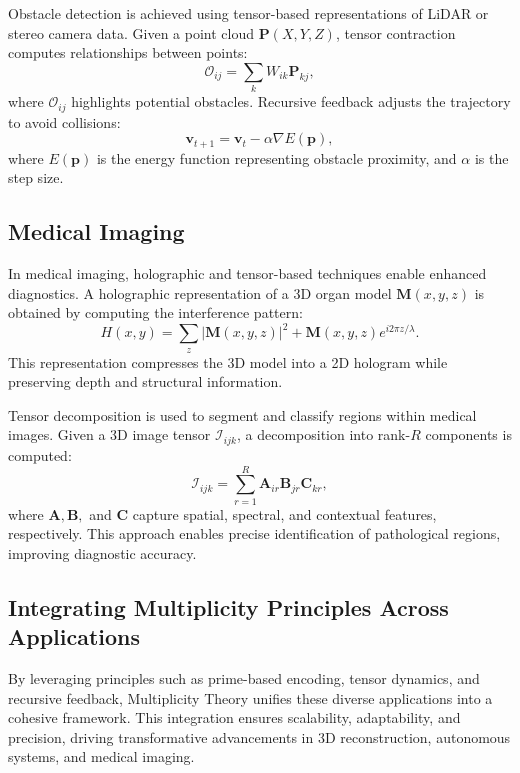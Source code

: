 \documentclass{article}
\theoremstyle{plain}
\begin{document}
Obstacle detection is achieved using tensor-based representations of LiDAR or stereo camera data. Given a point cloud \( \mathbf{P}(X, Y, Z) \), tensor contraction computes relationships between points:
\begin{equation}
\mathcal{O}_{ij} = \sum_{k} W_{ik} \mathbf{P}_{kj},
\end{equation}
where \( \mathcal{O}_{ij} \) highlights potential obstacles. Recursive feedback adjusts the trajectory to avoid collisions:
\begin{equation}
\mathbf{v}_{t+1} = \mathbf{v}_t - \alpha \nabla E(\mathbf{p}),
\end{equation}
where \( E(\mathbf{p}) \) is the energy function representing obstacle proximity, and \( \alpha \) is the step size.

\subsection{Medical Imaging}
In medical imaging, holographic and tensor-based techniques enable enhanced diagnostics. A holographic representation of a 3D organ model \( \mathbf{M}(x, y, z) \) is obtained by computing the interference pattern:
\begin{equation}
H(x, y) = \sum_{z} |\mathbf{M}(x, y, z)|^2 + \mathbf{M}(x, y, z) e^{i 2 \pi z / \lambda}.
\end{equation}
This representation compresses the 3D model into a 2D hologram while preserving depth and structural information.

Tensor decomposition is used to segment and classify regions within medical images. Given a 3D image tensor \( \mathcal{I}_{ijk} \), a decomposition into rank-\( R \) components is computed:
\begin{equation}
\mathcal{I}_{ijk} = \sum_{r=1}^R \mathbf{A}_{ir} \mathbf{B}_{jr} \mathbf{C}_{kr},
\end{equation}
where \( \mathbf{A}, \mathbf{B}, \) and \( \mathbf{C} \) capture spatial, spectral, and contextual features, respectively. This approach enables precise identification of pathological regions, improving diagnostic accuracy.

\subsection{Integrating Multiplicity Principles Across Applications}
By leveraging principles such as prime-based encoding, tensor dynamics, and recursive feedback, Multiplicity Theory unifies these diverse applications into a cohesive framework. This integration ensures scalability, adaptability, and precision, driving transformative advancements in 3D reconstruction, autonomous systems, and medical imaging.
\end{document}
